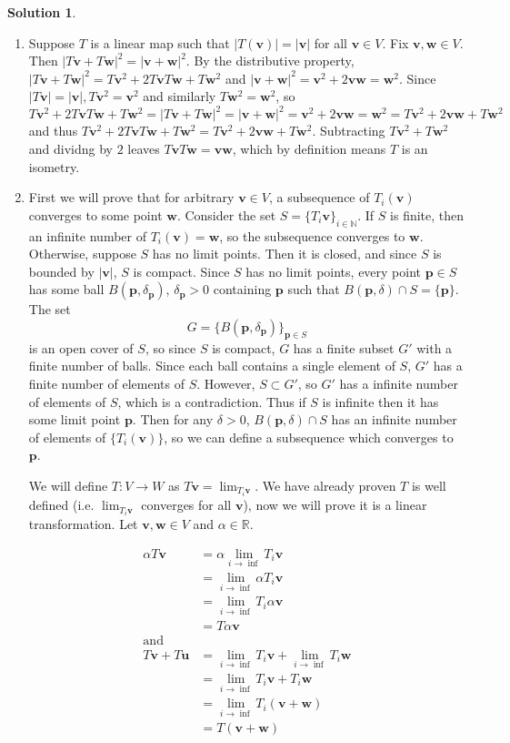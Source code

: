 \documentclass[11pt]{article}
\theoremstyle{definition}
\newtheorem*{solution}{Solution}
\newcommand{\R}{\mathbb{R}}
\newcommand{\N}{\mathbb{N}}
\newcommand{\de}{\delta}
\newcommand{\vp}{\mathbf{p}}
\newcommand{\vv}{\mathbf{v}}
\newcommand{\vu}{\mathbf{u}}
\newcommand{\vw}{\mathbf{w}}
\begin{document}
    \begin{solution}
        \begin{enumerate}[label = \alph*)]
            \item Suppose $T$ is a linear map such that $|T(\vv)| = |\vv|$ for all $\vv \in V$. Fix $\vv, \vw \in V$. Then $|T\vv + T\vw|^2 = |\vv + \vw|^2$. By the distributive property, $|T\vv + T\vw|^2 = T\vv^2 + 2T\vv T\vw + T\vw^2$ and $|\vv + \vw|^2 = \vv^2 + 2\vv\vw = \vw^2$. Since $|T\vv| = |\vv|, T\vv^2 = \vv^2$ and similarly $T\vw^2 = \vw^2$, so $T\vv^2 + 2T\vv T\vw + T\vw^2 = |T\vv + T\vw|^2 = |\vv + \vw|^2 = \vv^2 + 2\vv\vw = \vw^2 = T\vv^2 + 2\vv\vw + T\vw^2$ and thus $T\vv^2 + 2T\vv T\vw + T\vw^2 = T\vv^2 + 2\vv \vw + T\vw^2$. Subtracting $T\vv^2 + T\vw^2$ and dividng by $2$ leaves $T\vv T\vw = \vv\vw$, which by definition means $T$ is an isometry.
            \item First we will prove that for arbitrary $\vv \in V$, a subsequence of $T_i(\vv)$ converges to some point $\vw$. Consider the set $S = \{T_i\vv\}_{i \in \N}$. If $S$ is finite, then an infinite number of $T_i(\vv) = \vw$, so the subsequence converges to $\vw$. Otherwise, suppose $S$ has no limit points. Then it is closed, and since $S$ is bounded by $|\vv|$, $S$ is compact. Since $S$ has no limit points, every point $\vp \in S$ has some ball $B(\vp, \de_\vp)$, $\de_\vp > 0$ containing $\vp$ such that $B(\vp, \de) \cap S = \{\vp\}$. The set $$G = \{B(\vp, \de_\vp)\}_{\vp \in S}$$is an open cover of $S$, so since $S$ is compact, $G$ has a finite subset $G'$ with a finite number of balls. Since each ball contains a single element of $S$, $G'$ has a finite number of elements of $S$. However, $S \subset G'$, so $G'$ has a infinite number of elements of $S$, which is a contradiction. Thus if $S$ is infinite then it has some limit point $\vp$. Then for any $\de > 0$, $B(\vp, \de) \cap S$ has an infinite number of elements of $\{T_i(\vv)\}$, so we can define a subsequence which converges to $\vp$. 
            
            We will define $T:V \to W$ as $T\vv = \lim_{T_i\vv}$. We have already proven $T$ is well defined (i.e. $\lim_{T_i\vv}$ converges for all $\vv$), now we will prove it is a linear transformation. Let $\vv, \vw \in V$ and $\alpha \in \R$. 

            \begin{align*}
                \alpha T\vv &= \alpha \lim_{i \to \inf} T_i\vv \\
                &= \lim_{i \to \inf} \alpha T_i\vv\\
                &= \lim_{i \to \inf} T_i\alpha \vv\\
                &= T\alpha \vv\\
                \text{and}\\
                T\vv + T\vu &= \lim_{i \to \inf} T_i\vv + \lim_{i \to \inf} T_i\vw\\
                &= \lim_{i \to \inf} T_i \vv + T_i \vw\\
                &= \lim_{i \to \inf} T_i (\vv + \vw)\\
                &= T(\vv + \vw)
            \end{align*}


\end{enumerate}
\end{solution}
\end{document}
